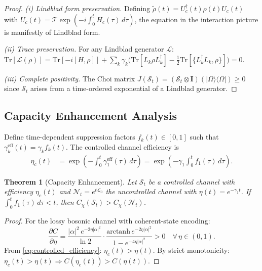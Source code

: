 \documentclass[journal,twocolumn]{IEEEtran}
\theoremstyle{definition}
\theoremstyle{plain}
\newtheorem{theorem}{Theorem}[section]
\newcommand{\tensor}{\otimes}
\newcommand{\Tr}{\mathrm{Tr}}
\begin{document}
\begin{proof}
\textit{(i) Lindblad form preservation.} Defining
$\tilde\rho(t)=U_c^\dagger(t)\rho(t)U_c(t)$ with
$U_c(t)=\mathcal{T}\exp(-i\int_0^t H_c(\tau)\,d\tau)$, the equation in
the interaction picture is manifestly of Lindblad form.

\textit{(ii) Trace preservation.} For any Lindblad generator
$\mathcal{L}$:
$\Tr[\mathcal{L}(\rho)]=\Tr[-i[H,\rho]]+\sum_k\gamma_k\bigl(\Tr[L_k\rho L_k^\dagger]-\tfrac{1}{2}\Tr[\{L_k^\dagger L_k,\rho\}]\bigr)=0$.

\textit{(iii) Complete positivity.} The Choi matrix
$J(\mathcal{S}_t)=(\mathcal{S}_t\tensor\mathbf{I})(|\Omega\rangle\langle\Omega|)\ge0$
since $\mathcal{S}_t$ arises from a time-ordered exponential of a
Lindblad generator.
\end{proof}

\subsection{Capacity Enhancement Analysis}

Define time-dependent suppression factors $f_k(t)\in[0,1]$ such that
$\gamma_k^{\mathrm{eff}}(t)=\gamma_k f_k(t)$. The controlled channel
efficiency is
\begin{align}
  \eta_c(t) &= \exp\!\left(-\int_0^t\gamma_1^{\mathrm{eff}}(\tau)\,d\tau\right)
  =\exp\!\left(-\gamma_1\int_0^t f_1(\tau)\,d\tau\right).
  \label{eq:controlled_efficiency}
\end{align}

\begin{theorem}[Capacity Enhancement]
\label{thm:capacity_enhancement}
Let $\mathcal{S}_t$ be a controlled channel with efficiency $\eta_c(t)$
and $\mathcal{N}_t=e^{t\mathcal{L}_0}$ the uncontrolled channel with
$\eta(t)=e^{-\gamma_1 t}$. If
$\int_0^t f_1(\tau)\,d\tau<t$, then
$C_\chi(\mathcal{S}_t)>C_\chi(\mathcal{N}_t)$.
\end{theorem}

\begin{proof}
For the lossy bosonic channel with coherent-state encoding:
\begin{equation}
  \frac{\partial C}{\partial\eta}=\frac{|\alpha|^2\,e^{-2\eta|\alpha|^2}}{\ln2}
  \cdot\frac{\mathrm{arctanh}\,e^{-2\eta|\alpha|^2}}{1-e^{-4\eta|\alpha|^2}}>0
  \quad\forall\,\eta\in(0,1).
\end{equation}
From \cref{eq:controlled_efficiency}: $\eta_c(t)>\eta(t)$. By strict
monotonicity:
$\eta_c(t)>\eta(t)\Rightarrow C(\eta_c(t))>C(\eta(t))$.
\end{proof}
\end{document}
